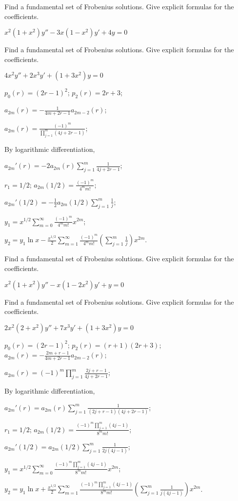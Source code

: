 \documentclass{ximera}
\begin{document}
\begin{problem}\label{exer:7.6.29}
Find a
fundamental set of Frobenius solutions. Give explicit formulas for the
coefficients.

$x^2(1+x^2)y''-3x(1-x^2)y'+4y=0$
\end{problem}

\begin{problem}\label{exer:7.6.30}
Find a
fundamental set of Frobenius solutions. Give explicit formulas for the
coefficients.

$4x^2y''+2x^3y'+(1+3x^2)y=0$

\begin{solution}
    $p_0(r)=(2r-1)^2$;
$p_2(r)=2r+3$;

$a_{2m}(r)=-\frac{1}{4m+2r-1}
a_{2m-2}(r)$;

 $a_{2m}(r)=\frac{(-1)^m}{\prod_{j=1}^m(4j+2r-1)}$;

By logarithmic differentiation,

$a_{2m}'(r)=-2a_{2m}(r)\sum_{j=1}^m\frac{1}{4j+2r-1}$;

$r_1=1/2$;
$a_{2m}(1/2)=\frac{(-1)^m}{4^mm!}$;

$a_{2m}'(1/2)=-\frac{1}{2}a_{2m}(1/2)\sum_{j=1}^m\frac{1}{ j}$;

$y_1=x^{1/2}\sum_{m=0}^\infty\frac{(-1)^m}{4^mm!}x^{2m}$;

$y_2=y_1\ln x-\frac{x^{1/2}}{2}\sum_{m=1}^\infty\frac{(-1)^m}{
4^mm!}\left(\sum_{j=1}^m\frac{1}{ j}\right) x^{2m}$.
\end{solution}
\end{problem}

\begin{problem}\label{exer:7.6.31}
Find a
fundamental set of Frobenius solutions. Give explicit formulas for the
coefficients.

$x^2(1+x^2)y''-x(1-2x^2)y'+y=0$
\end{problem}

\begin{problem}\label{exer:7.6.32}
Find a
fundamental set of Frobenius solutions. Give explicit formulas for the
coefficients.

$2x^2(2+x^2)y''+7x^3y'+(1+3x^2)y=0$

\begin{solution}
    $p_0(r)=(2r-1)^2$;
$p_2(r)=(r+1)(2r+3)$;
$a_{2m}(r)=-\frac{2m+r-1}{4m+2r-1}
a_{2m-2}(r)$;

 $a_{2m}(r)=(-1)^m\prod_{j=1}^m\frac{2j+r-1}{4j+2r-1}$;

By logarithmic differentiation,

$a_{2m}'(r)=a_{2m}(r)\sum_{j=1}^m\frac{1}{(2j+r-1)(4j+2r-1)}$;

$r_1=1/2$;
$a_{2m}(1/2)=\frac{(-1)^m\prod_{j=1}^m(4j-1)}{8^mm!}$;

$a_{2m}'(1/2)=a_{2m}(1/2)\sum_{j=1}^m\frac{1}{2j(4j-1)}$;


$y_1=x^{1/2}\sum_{m=0}^\infty\frac{(-1)^m\prod_{j=1}^m(4j-1)}{8^mm!}
x^{2m}$;

$y_2=y_1\ln
x+\frac{x^{1/2}}{2}\sum_{m=1}^\infty\frac{(-1)^m\prod_{j=1}^m(4j-1)}{8^mm!}
\left(\sum_{j=1}^m\frac{1}{ j(4j-1)}\right)x^{2m}$.

\end{solution}
\end{problem}
\end{document}
